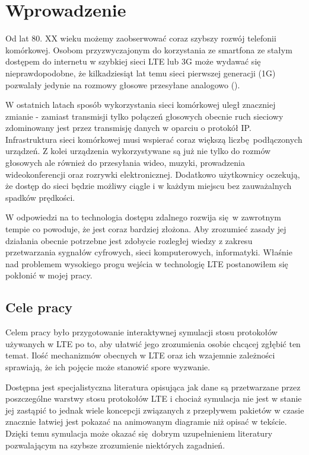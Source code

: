\chapter{Wprowadzenie}
\label{cha:wprowadzenie}

Od lat 80. XX wieku możemy zaobserwować coraz szybszy rozwój telefonii komórkowej. Osobom przyzwyczajonym do korzystania ze smartfona ze stałym dostępem do internetu w szybkiej sieci LTE lub 3G może wydawać się nieprawdopodobne, że kilkadziesiąt lat temu sieci pierwszej generacji (1G) pozwalały jedynie na rozmowy głosowe przesyłane analogowo (\cite{TanWet11}).

W ostatnich latach sposób wykorzystania sieci komórkowej uległ znaczniej zmianie - zamiast transmisji tylko połączeń głosowych obecnie ruch sieciowy zdominowany jest przez transmisję danych w oparciu o protokół IP. Infrastruktura sieci komórkowej musi wspierać coraz większą liczbę podłączonych urządzeń. Z kolei urządzenia wykorzystywane są już nie tylko do rozmów głosowych ale również do przesyłania wideo, muzyki, prowadzenia wideokonferencji oraz rozrywki elektronicznej. Dodatkowo użytkownicy oczekują, że dostęp do sieci będzie możliwy ciągle i w każdym miejscu bez zauważalnych spadków prędkości.

W odpowiedzi na to technologia dostępu zdalnego rozwija się w zawrotnym tempie co powoduje, że jest coraz bardziej złożona. Aby zrozumieć zasady jej działania obecnie potrzebne jest zdobycie rozległej wiedzy z zakresu przetwarzania sygnałów cyfrowych, sieci komputerowych, informatyki. Właśnie nad problemem wysokiego progu wejścia w technologię LTE postanowiłem się pokłonić w mojej pracy.

\section{Cele pracy}					
\label{sec:celePracy}

Celem pracy było przygotowanie interaktywnej symulacji stosu protokołów używanych w LTE po to, aby ułatwić jego zrozumienia osobie chcącej zgłębić ten temat. Ilość mechanizmów obecnych w LTE oraz ich wzajemnie zależności sprawiają, że ich pojęcie może stanowić spore wyzwanie.

Dostępna jest specjalistyczna literatura opisująca jak dane są przetwarzane przez poszczególne warstwy stosu protokołów LTE i chociaż symulacja nie jest w stanie jej zastąpić to jednak wiele koncepcji związanych z przepływem pakietów w czasie znacznie łatwiej jest pokazać na animowanym diagramie niż opisać w tekście. Dzięki temu symulacja może okazać się dobrym uzupełnieniem literatury pozwalającym na szybsze zrozumienie niektórych zagadnień.

